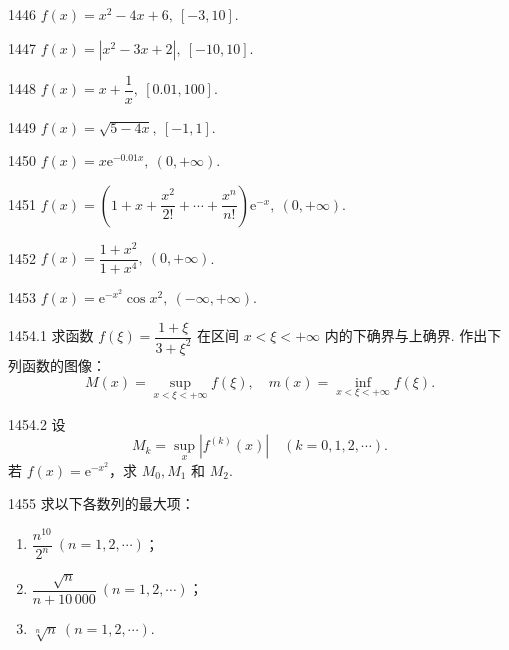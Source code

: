 \begin{prob}[S]{1446}
$f(x) = x^2 - 4x + 6, \ [-3, 10]$.
\end{prob}

\begin{prob}[S]{1447}
$f(x) = |x^2 - 3x + 2|, \ [-10, 10]$.
\end{prob}

\begin{prob}[S]{1448}
$f(x) = x + \dfrac{1}{x}, \ [0.01, 100]$.
\end{prob}

\begin{prob}[S]{1449}
$f(x) = \sqrt{5 - 4x}, \ [-1, 1]$.
\end{prob}


\begin{prob}[S]{1450}
$f(x) = x\mathrm{e}^{-0.01x}, \ (0, +\infty)$.
\end{prob}

\begin{prob}[S]{1451}
$f(x) = \left(1 + x + \dfrac{x^2}{2!} + \cdots + \dfrac{x^n}{n!}\right)\mathrm{e}^{-x}, \ (0, +\infty)$.
\end{prob}

\begin{prob}[S]{1452}
$f(x) = \dfrac{1 + x^2}{1 + x^4}, \ (0, +\infty)$.
\end{prob}

\begin{prob}[S]{1453}
$f(x) = \mathrm{e}^{-x^2} \cos x^2, \ (-\infty, +\infty)$.
\end{prob}

\begin{prob}[M]{1454.1}
求函数 $f(\xi) = \dfrac{1 + \xi}{3 + \xi^2}$ 在区间 $x < \xi < +\infty$ 内的下确界与上确界. 作出下列函数的图像：
\[
M(x) = \sup_{x < \xi < +\infty} f(\xi), \quad m(x) = \inf_{x < \xi < +\infty} f(\xi).
\]
\end{prob}

\begin{prob}[M]{1454.2}
设
\[
M_k = \sup_x |f^{(k)}(x)| \quad (k = 0, 1, 2, \cdots).
\]
若 $f(x) = \mathrm{e}^{-x^2}$，求 $M_0, M_1$ 和 $M_2$.
\end{prob}

\begin{prob}[L]{1455}
求以下各数列的最大项：
\begin{enumerate}[label=(\alph*), itemsep=2pt, topsep=3pt]
    \item $\dfrac{n^{10}}{2^n} \ (n = 1, 2, \cdots)$；
    \item $\dfrac{\sqrt{n}}{n + 10\,000} \ (n = 1, 2, \cdots)$；
    \item $\sqrt[n]{n} \ (n = 1, 2, \cdots)$.
\end{enumerate}
\end{prob}

